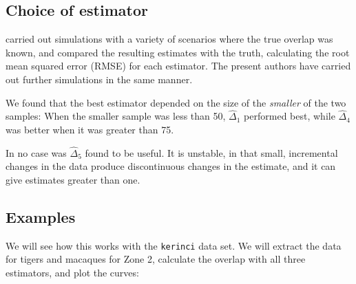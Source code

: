 \documentclass[a4paper]{article}
\begin{document}
\subsection{Choice of estimator}
\label{subsec:whichDhat}

\citet{RidoutLinkie2009} carried out simulations with a variety of scenarios where the true overlap was known, and compared the resulting estimates with the truth, calculating the root mean squared error (RMSE) for each estimator. The present authors have carried out further simulations in the same manner.

We found that the best estimator depended on the size of the \emph{smaller} of the two samples: When the smaller sample was less than 50, $\hat{\Delta}_1$ performed best, while $\hat{\Delta}_4$ was better when it was greater than 75.

In no case was $\hat{\Delta}_5$ found to be useful. It is unstable, in that small, incremental changes in the data produce discontinuous changes in the estimate, and it can give estimates greater than one.


\subsection{Examples}
\label{subsec:examples}

We will see how this works with the \texttt{kerinci} data set. We will extract the data for tigers and macaques for Zone 2, calculate the overlap with all three estimators, and plot the curves:
\end{document}
